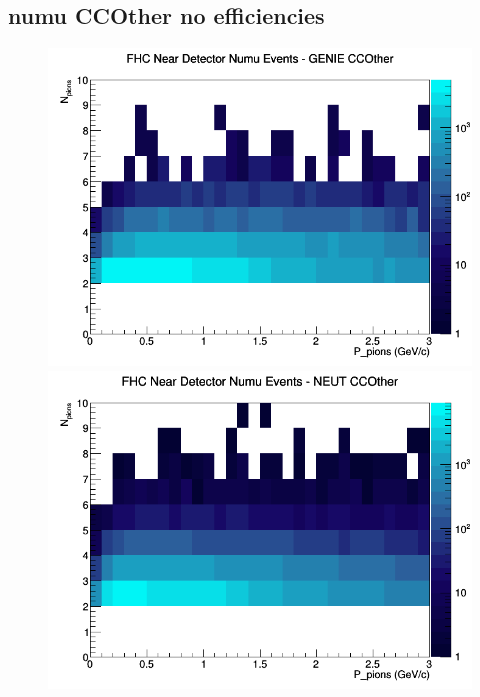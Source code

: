 \documentclass[12pt]{article}
\begin{document}
\subsection{numu CCOther no efficiencies}
\begin{figure}[h]
\includegraphics[width=\linewidth]{N_P/nominal/pions/CCOther_FHC_ND_numu_N_P_GENIE.png}
\endminipage
{}
\includegraphics[width=\linewidth]{N_P/nominal/pions/CCOther_FHC_ND_numu_N_P_NEUT.png}
\endminipage
{}

\end{figure}
\end{document}
